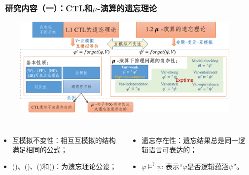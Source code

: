 \documentclass[aspectratio=1610, 9pt, CJK]{beamer}
\begin{document}
\begin{frame}  
	\frametitle{~研究内容（一）：CTL和$\mu$-演算的遗忘理论}
	\begin{figure}
		\includegraphics[scale=0.45]{figures/ctlMuForgFrame}
	\end{figure}
	{\tiny 
		\begin{columns}
			\begin{itemize} 
				\item 互模拟不变性：相互互模拟的结构满足相同的公式；
				\item (\W)、(\PP)、(\NgP)和(\IR)：为遗忘理论公设；
			\end{itemize}
			\begin{itemize}
				\item 遗忘存在性：遗忘结果总是同一逻辑语言可表达的；
				\item $\varphi \models^? \psi$: 表示“$\varphi$是否逻辑蕴涵$\psi$”。
			\end{itemize}
		\end{columns}
	} 
\end{frame}
\end{document}
